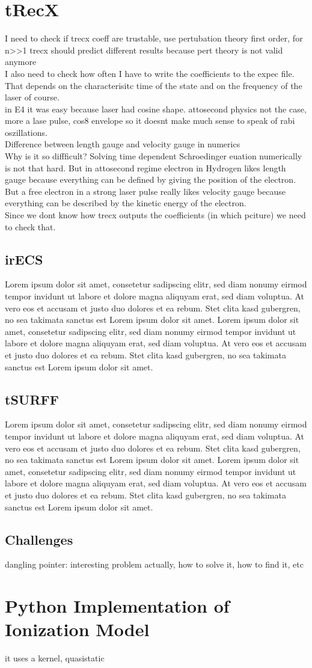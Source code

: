 \section{tRecX}
I need to check if trecx coeff are trustable, use pertubation theory first order, for n>>1 trecx should predict different results because pert theory is not valid anymore\\
I also need to check how often I have to write the coefficients to the expec file. That depends on the characterisitc time of the state and on the frequency of the laser of course.\\
in E4 it was easy because laser had cosine shape. attosecond physics not the case, more a lase pulse, cos8 envelope so it doesnt make much sense to speak of rabi oszillations.\\
Difference between length gauge and velocity gauge in numerics\\
Why is it so diffficult? Solving time dependent Schroedinger euation numerically is not that hard. But in attosecond regime electron in Hydrogen likes length gauge because everything can be defined by giving the position of the electron. 
But a free electron in a strong laser pulse really likes velocity gauge because everything can be described by the kinetic energy of the electron.\\
Since we dont know how trecx outputs the coefficients (in which pciture) we need to check that.
\subsection{irECS}
Lorem ipsum dolor sit amet, consetetur sadipscing elitr, sed diam nonumy eirmod tempor invidunt ut labore et dolore magna aliquyam erat, sed diam voluptua. At vero eos et accusam et justo duo dolores et ea rebum. Stet clita kasd gubergren, no sea takimata sanctus est Lorem ipsum dolor sit amet. Lorem ipsum dolor sit amet, consetetur sadipscing elitr, sed diam nonumy eirmod tempor invidunt ut labore et dolore magna aliquyam erat, sed diam voluptua. At vero eos et accusam et justo duo dolores et ea rebum. Stet clita kasd gubergren, no sea takimata sanctus est Lorem ipsum dolor sit amet.
\subsection{tSURFF}
Lorem ipsum dolor sit amet, consetetur sadipscing elitr, sed diam nonumy eirmod tempor invidunt ut labore et dolore magna aliquyam erat, sed diam voluptua. At vero eos et accusam et justo duo dolores et ea rebum. Stet clita kasd gubergren, no sea takimata sanctus est Lorem ipsum dolor sit amet. Lorem ipsum dolor sit amet, consetetur sadipscing elitr, sed diam nonumy eirmod tempor invidunt ut labore et dolore magna aliquyam erat, sed diam voluptua. At vero eos et accusam et justo duo dolores et ea rebum. Stet clita kasd gubergren, no sea takimata sanctus est Lorem ipsum dolor sit amet.
\subsection{Challenges}
dangling pointer: interesting problem actually, how to solve it, how to find it, etc

\newpage
\section{Python Implementation of Ionization Model}
it uses a kernel, quasistatic
